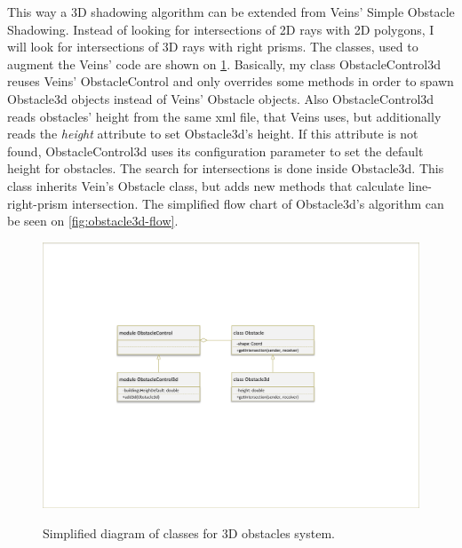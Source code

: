 \documentclass[]{nsm-thesis}
\begin{document}
This way a 3D shadowing algorithm can be extended from Veins' Simple Obstacle Shadowing. Instead of looking for intersections of 2D rays with 2D polygons, I will look for intersections of 3D rays with right prisms. The classes, used to augment the Veins' code are shown on \cref{fig:obstacle3d-classes}.  Basically, my class ObstacleControl3d reuses Veins' ObstacleControl and only overrides some methods in order to spawn Obstacle3d objects instead of Veins' Obstacle objects. Also ObstacleControl3d reads obstacles' height from the same xml file, that Veins uses, but additionally reads the \emph{height} attribute to set Obstacle3d's height. If this attribute is not found, ObstacleControl3d uses its configuration parameter to set the default height for obstacles. The search for intersections is done inside Obstacle3d. This class inherits Vein's Obstacle class, but adds new methods that calculate line-right-prism intersection. The simplified flow chart of Obstacle3d's algorithm can be seen on \cref{fig:obstacle3d-flow}. 

\begin{figure}
  	\caption{Simplified diagram of classes for 3D obstacles system.}
	\centering
	\includegraphics[width=1\textwidth]{figures/Obstacle3d-classes.pdf}
	\label{fig:obstacle3d-classes}
\end{figure}
\end{document}
